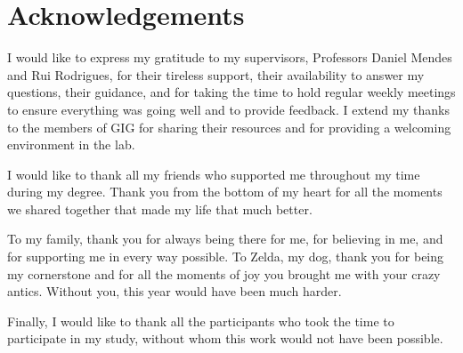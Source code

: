 \chapter*{Acknowledgements}

I would like to express my gratitude to my supervisors, Professors Daniel Mendes and Rui Rodrigues, for their tireless support, their availability to answer my questions, their guidance, and for taking the time to hold regular weekly meetings to ensure everything was going well and to provide feedback. I extend my thanks to the members of GIG for sharing their resources and for providing a welcoming environment in the lab. 

I would like to thank all my friends who supported me throughout my time during my degree. Thank you from the bottom of my heart for all the moments we shared together that made my life that much better.

To my family, thank you for always being there for me, for believing in me, and for supporting me in every way possible. To Zelda, my dog, thank you for being my cornerstone and for all the moments of joy you brought me with your crazy antics. Without you, this year would have been much harder.

Finally, I would like to thank all the participants who took the time to participate in my study, without whom this work would not have been possible.

\vspace{10mm}

